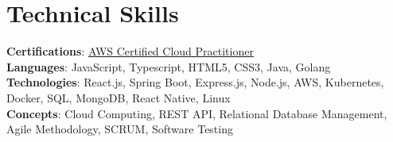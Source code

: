 \section{Technical Skills}
    \begin{itemize}[leftmargin=0.15in, label={}]
	\small{\item{
		\textbf{Certifications}{: \href{https://www.credly.com/badges/b6b11eb9-15a3-4bf0-8542-85e1f57f57ce/linked_in_profile}{AWS Certified Cloud Practitioner}} \\
		\textbf{Languages}{: JavaScript, Typescript, HTML5, CSS3, Java, Golang } \\
		\textbf{Technologies}{: React.js, Spring Boot, Express.js, Node.js, AWS, Kubernetes, Docker, SQL, MongoDB, React Native, Linux } \\
		\textbf{Concepts}{: Cloud Computing, REST API, Relational Database Management, Agile Methodology, SCRUM,  Software Testing }
	}}
    \end{itemize}